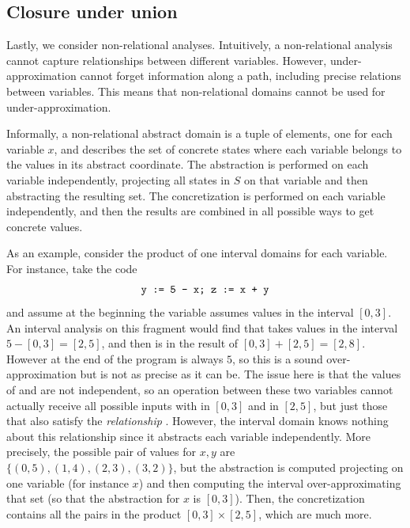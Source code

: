 \subsection*{Closure under union}
Lastly, we consider non-relational analyses. Intuitively, a non-relational analysis cannot capture relationships between different variables. However, under-approximation cannot forget information along a path, including precise relations between variables. This means that non-relational domains cannot be used for under-approximation.

\begin{example}
	Informally, a non-relational abstract domain is a tuple of elements, one for each variable $x$, and describes the set of concrete states where each variable belongs to the values in its abstract coordinate. The abstraction is performed on each variable independently, projecting all states in $S$ on that variable and then abstracting the resulting set. The concretization is performed on each variable independently, and then the results are combined in all possible ways to get concrete values.

	As an example, consider the product of one interval domains for each variable. For instance, take the code
	\[
	\texttt{y := 5 - x; z := x + y}
	\]
	and assume at the beginning the variable  assumes values in the interval $[0, 3]$. An interval analysis on this fragment would find that  takes values in the interval $5 - [0, 3] = [2, 5]$, and then  is in the result of $[0, 3] + [2, 5] = [2, 8]$. However at the end of the program  is always $5$, so this is a sound over-approximation but is not as precise as it can be.
	The issue here is that the values of  and  are not independent, so an operation between these two variables cannot actually receive all possible inputs with  in $[0, 3]$ and  in $[2, 5]$, but just those that also satisfy the \textit{relationship} . However, the interval domain knows nothing about this relationship since it abstracts each variable independently. More precisely, the possible pair of values for $x, y$ are $\{ (0, 5), (1, 4), (2, 3), (3, 2) \}$, but the abstraction is computed projecting on one variable (for instance $x$) and then computing the interval over-approximating that set (so that the abstraction for $x$ is $[0, 3]$). Then, the concretization contains all the pairs in the product $[0, 3] \times [2, 5]$, which are much more.


\end{example}
